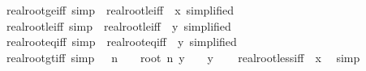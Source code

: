 \begin{isabellebody}
\isamarkupfalse%
\ real{\isacharunderscore}{\kern0pt}root{\isacharunderscore}{\kern0pt}ge{\isacharunderscore}{\kern0pt}{}{\isacharunderscore}{\kern0pt}iff\ {\isacharbrackleft}{\kern0pt}simp{\isacharbrackright}{\kern0pt}\ {\isacharequal}{\kern0pt}\ real{\isacharunderscore}{\kern0pt}root{\isacharunderscore}{\kern0pt}le{\isacharunderscore}{\kern0pt}iff\ {\isacharbrackleft}{\kern0pt}\ x{\isacharequal}{\kern0pt}{}{\isacharcomma}{\kern0pt}\ simplified{\isacharbrackright}{\kern0pt}\isanewline
{}\isamarkupfalse%
\ real{\isacharunderscore}{\kern0pt}root{\isacharunderscore}{\kern0pt}le{\isacharunderscore}{\kern0pt}{}{\isacharunderscore}{\kern0pt}iff\ {\isacharbrackleft}{\kern0pt}simp{\isacharbrackright}{\kern0pt}\ {\isacharequal}{\kern0pt}\ real{\isacharunderscore}{\kern0pt}root{\isacharunderscore}{\kern0pt}le{\isacharunderscore}{\kern0pt}iff\ {\isacharbrackleft}{\kern0pt}\ y{\isacharequal}{\kern0pt}{}{\isacharcomma}{\kern0pt}\ simplified{\isacharbrackright}{\kern0pt}\isanewline
{}\isamarkupfalse%
\ real{\isacharunderscore}{\kern0pt}root{\isacharunderscore}{\kern0pt}eq{\isacharunderscore}{\kern0pt}{}{\isacharunderscore}{\kern0pt}iff\ {\isacharbrackleft}{\kern0pt}simp{\isacharbrackright}{\kern0pt}\ {\isacharequal}{\kern0pt}\ real{\isacharunderscore}{\kern0pt}root{\isacharunderscore}{\kern0pt}eq{\isacharunderscore}{\kern0pt}iff\ {\isacharbrackleft}{\kern0pt}\ y{\isacharequal}{\kern0pt}{}{\isacharcomma}{\kern0pt}\ simplified{\isacharbrackright}{\kern0pt}\isanewline
\isanewline
{}\isamarkupfalse%
\ real{\isacharunderscore}{\kern0pt}root{\isacharunderscore}{\kern0pt}gt{\isacharunderscore}{\kern0pt}{}{\isacharunderscore}{\kern0pt}iff\ {\isacharbrackleft}{\kern0pt}simp{\isacharbrackright}{\kern0pt}{\isacharcolon}{\kern0pt}\ {\isachardoublequoteopen}{}\ {\isacharless}{\kern0pt}\ n\ {\isasymLongrightarrow}\ {}\ {\isacharless}{\kern0pt}\ root\ n\ y\ {\isasymlongleftrightarrow}\ {}\ {\isacharless}{\kern0pt}\ y{\isachardoublequoteclose}\isanewline
%
\isadelimproof
\ \ %
\endisadelimproof
%
\isatagproof
{}\isamarkupfalse%
\ real{\isacharunderscore}{\kern0pt}root{\isacharunderscore}{\kern0pt}less{\isacharunderscore}{\kern0pt}iff\ {\isacharbrackleft}{\kern0pt}\ x{\isacharequal}{\kern0pt}{}{\isacharbrackright}{\kern0pt}\ \isamarkupfalse%
\ simp%
\endisatagproof
{\isafoldproof}%
%
\isadelimproof

\end{isabellebody}
